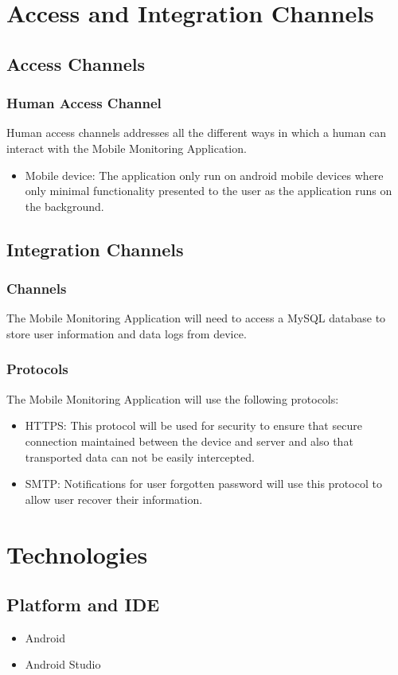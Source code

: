 \documentclass[hidelinks, 12pt, oneside]{article}
\begin{document}
	\section{Access and Integration Channels}
	\subsection{Access Channels}
	\subsubsection{Human Access Channel}
	Human access channels addresses all the different ways in which a human can interact with the Mobile Monitoring Application.
	\begin{itemize}
		\item Mobile device: The application only run on android mobile devices where only minimal functionality presented to the user as the application runs on the background.   
	\end{itemize}
	\subsection{Integration Channels}
	\subsubsection{Channels}
	The Mobile Monitoring Application will need to access a MySQL database to store user information and data logs from device.    	\subsubsection{Protocols}
	The Mobile Monitoring Application will use the following protocols:
	\begin{itemize}
	\item HTTPS: This protocol will be used for security to ensure that secure connection maintained between the device and server and also that transported data can not be easily intercepted.
	\item SMTP: Notifications for user forgotten password will use this protocol to allow user recover their information.  
	\end{itemize}	 
	\newpage
	\section{Technologies}
	\subsection{Platform and IDE}
	\begin{itemize}
	\item Android
	\item Android Studio
	\end{itemize}
\end{document}
